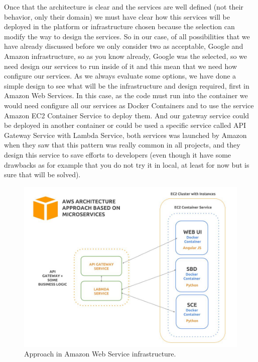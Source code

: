 \noindent Once that the architecture is clear and the services are well defined
(not their behavior, only their domain) we must have clear how this services will
be deployed in the platform or infrastructure chosen because the selection can
modify the way to design the services.
\intro
So in our case, of all possibilities that we have already discussed before we
only consider two as acceptable, Google and Amazon infrastructure, so as you
know already, Google was the selected, so we need design our services to run
inside of it and this mean that we need how configure our services.
\intro
As we always evaluate some options, we have done a simple design to see what
will be the infrastructure and design required, first in Amazon Web Services.
\intro
In this case, as the code must run into the container we would need configure
all our services as Docker Containers and to use the service Amazon EC2 Container
Service to deploy them. And our gateway service could be deployed in another
container or could be used a specific service called API Gateway Service with
Lambda Service, both services was launched by Amazon when they saw that this
pattern was really common in all projects, and they design this service to save
efforts to developers (even though it have some drawbacks as for example that you
do not try it in local, at least for now but is sure that will be solved).

\begin{figure}[H]
  \includegraphics[scale=0.35]{img/graphics/aws_approach.jpg}
  \centering
  \caption{Approach in Amazon Web Service infrastructure.}
\end{figure}

